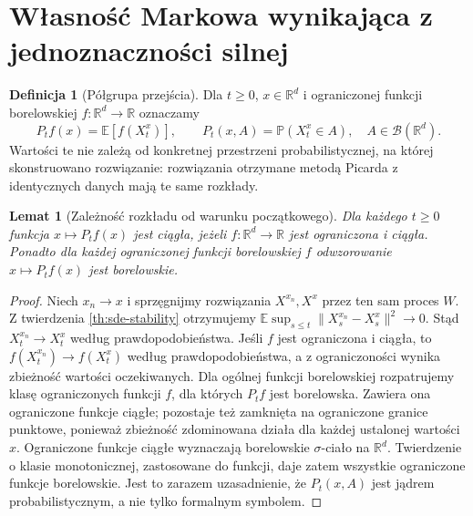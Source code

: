 \documentclass[11pt,a4paper,oneside]{report}
\numberwithin{equation}{chapter}
\theoremstyle{plain}
\newtheorem{lemat}[twierdzenie]{Lemat}
\theoremstyle{definition}
\newtheorem{definicja}{Definicja}[chapter]
\theoremstyle{remark}
\newcommand{\R}{\mathbb{R}}
\newcommand{\Prob}{\mathbb{P}}
\newcommand{\E}{\mathbb{E}}
\newcommand{\calB}{\mathcal{B}}
\newcommand{\norm}[1]{\lVert #1\rVert}
\begin{document}
\section{Własność Markowa wynikająca z jednoznaczności silnej}
\begin{definicja}[Półgrupa przejścia]
Dla $t\ge0$, $x\in\R^d$ i ograniczonej funkcji
borelowskiej $f:\R^d\to\R$ oznaczamy
\[
P_tf(x)=\E[f(X_t^x)],\qquad
P_t(x,A)=\Prob(X_t^x\in A),\quad A\in\calB(\R^d).
\tag{6.2}\label{eq:sde-semigroup}
\]
Wartości te nie zależą od konkretnej przestrzeni
probabilistycznej, na której skonstruowano rozwiązanie:
rozwiązania otrzymane metodą Picarda z identycznych
danych mają te same rozkłady.
\end{definicja}

\begin{lemat}[Zależność rozkładu od warunku początkowego]
\label{lem:sde-kernel}
Dla każdego $t\ge0$ funkcja $x\mapsto P_tf(x)$
jest ciągła, jeżeli $f:\R^d\to\R$ jest ograniczona
i ciągła. Ponadto dla każdej ograniczonej funkcji
borelowskiej $f$ odwzorowanie $x\mapsto P_tf(x)$
jest borelowskie.
\end{lemat}
\begin{proof}
Niech $x_n\to x$ i sprzęgnijmy rozwiązania
$X^{x_n},X^x$ przez ten sam proces $W$.
Z twierdzenia \ref{th:sde-stability} otrzymujemy
$\E\sup_{s\le t}\norm{X_s^{x_n}-X_s^x}^2\to0$.
Stąd $X_t^{x_n}\to X_t^x$ według prawdopodobieństwa.
Jeśli $f$ jest ograniczona i ciągła, to
$f(X_t^{x_n})\to f(X_t^x)$ według prawdopodobieństwa,
a z ograniczoności wynika zbieżność wartości oczekiwanych.
Dla ogólnej funkcji borelowskiej rozpatrujemy klasę
ograniczonych funkcji $f$, dla których $P_tf$ jest
borelowska. Zawiera ona ograniczone funkcje ciągłe;
pozostaje też zamknięta na ograniczone granice punktowe,
ponieważ zbieżność zdominowana działa dla każdej
ustalonej wartości $x$. Ograniczone funkcje ciągłe
wyznaczają borelowskie $\sigma$-ciało na $\R^d$.
Twierdzenie o klasie monotonicznej, zastosowane do
funkcji, daje zatem wszystkie ograniczone funkcje
borelowskie. Jest to zarazem uzasadnienie, że
$P_t(x,A)$ jest jądrem probabilistycznym, a nie
tylko formalnym symbolem.
\end{proof}
\end{document}

